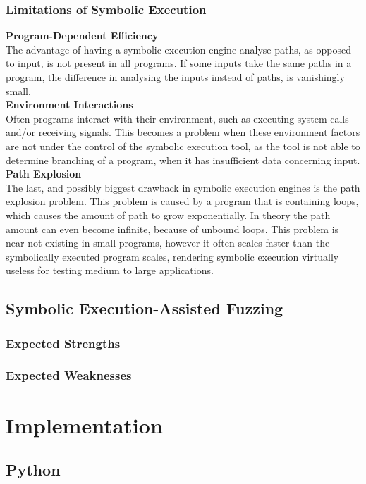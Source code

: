 \documentclass[a4paper]{article}
\newcommand{\tbf}[1]{\textbf{#1}}
\begin{document}
\subsubsection*{Limitations of Symbolic Execution}
\tbf{Program-Dependent Efficiency}\\
The advantage of having a symbolic execution-engine analyse paths, as opposed to input, is not present in all programs. If some inputs take the same paths in a program, the difference in analysing the inputs instead of paths, is vanishingly small.\\
\tbf{Environment Interactions}\\
Often programs interact with their environment, such as executing system calls and/or receiving signals. This becomes a problem when these environment factors are not under the control of the symbolic execution tool, as the tool is not able to determine branching of a program, when it has insufficient data concerning input.\\
\tbf{Path Explosion}\\
The last, and possibly biggest drawback in symbolic execution engines is the path explosion problem. This problem is caused by a program that is containing loops, which causes the amount of path to grow exponentially. In theory the path amount can even become infinite, because of unbound loops. This problem is near-not-existing in small programs, however it often scales faster than the symbolically executed program scales, rendering symbolic execution virtually useless for testing medium to large applications.
\subsection{Symbolic Execution-Assisted Fuzzing}
\subsubsection*{Expected Strengths}
\subsubsection*{Expected Weaknesses}

\section{Implementation}
\subsection{Python}
\end{document}
